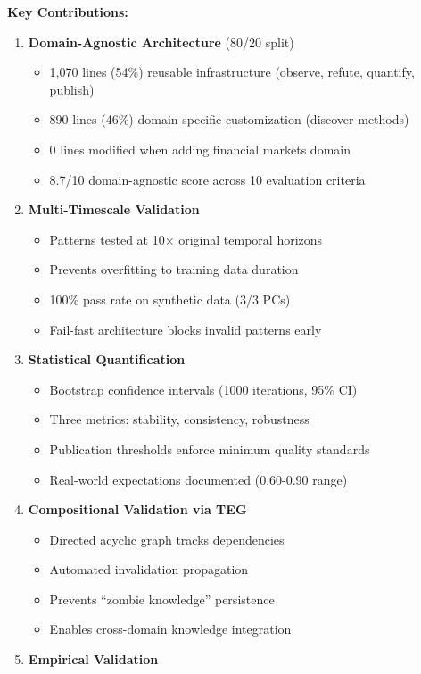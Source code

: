 \documentclass[
]{article}
\providecommand{\tightlist}{%
  \setlength{\itemsep}{0pt}\setlength{\parskip}{0pt}}
\begin{document}
\textbf{Key Contributions:}

\begin{enumerate}
\def\labelenumi{\arabic{enumi}.}
\tightlist
\item
  \textbf{Domain-Agnostic Architecture} (80/20 split)

  \begin{itemize}
  \tightlist
  \item
    1,070 lines (54\%) reusable infrastructure (observe, refute,
    quantify, publish)
  \item
    890 lines (46\%) domain-specific customization (discover methods)
  \item
    0 lines modified when adding financial markets domain
  \item
    8.7/10 domain-agnostic score across 10 evaluation criteria
  \end{itemize}
\item
  \textbf{Multi-Timescale Validation}

  \begin{itemize}
  \tightlist
  \item
    Patterns tested at 10× original temporal horizons
  \item
    Prevents overfitting to training data duration
  \item
    100\% pass rate on synthetic data (3/3 PCs)
  \item
    Fail-fast architecture blocks invalid patterns early
  \end{itemize}
\item
  \textbf{Statistical Quantification}

  \begin{itemize}
  \tightlist
  \item
    Bootstrap confidence intervals (1000 iterations, 95\% CI)
  \item
    Three metrics: stability, consistency, robustness
  \item
    Publication thresholds enforce minimum quality standards
  \item
    Real-world expectations documented (0.60-0.90 range)
  \end{itemize}
\item
  \textbf{Compositional Validation via TEG}

  \begin{itemize}
  \tightlist
  \item
    Directed acyclic graph tracks dependencies
  \item
    Automated invalidation propagation
  \item
    Prevents ``zombie knowledge'' persistence
  \item
    Enables cross-domain knowledge integration
  \end{itemize}
\item
  \textbf{Empirical Validation}


\end{enumerate}
\end{document}
